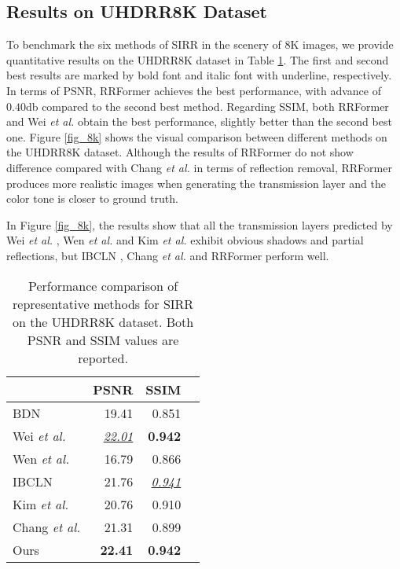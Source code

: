 \documentclass[10pt,journal]{IEEEtran}
\begin{document}
\subsection{Results on UHDRR8K Dataset}
To benchmark the six methods of SIRR in the scenery of 8K images, we provide quantitative results on the UHDRR8K dataset in Table \ref{table_8k}. The first and second best results are marked by bold font and italic font with underline, respectively. In terms of PSNR, RRFormer achieves the best performance, with advance of $0.40$db compared to the second best method. Regarding SSIM, both RRFormer and Wei \textit{et al.} \cite{weiSingleImageReflection2019} obtain the best performance, slightly better than the second best one. 
Figure \ref{fig_8k} shows the visual comparison between different methods on the UHDRR8K dataset. Although the results of RRFormer do not show difference compared with Chang \textit{et al.} \cite{changSingleImageReflection2021} in terms of reflection removal, RRFormer produces more realistic images when generating the transmission layer and the color tone is closer to ground truth. 

In Figure \ref{fig_8k}, the results show that all the transmission layers predicted by Wei \textit{et al.} \cite{weiSingleImageReflection2019}, Wen \textit{et al.} \cite{wenSingleImageReflection2019} and Kim \textit{et al.} \cite{kimSingleImageReflection2020} exhibit obvious shadows and partial reflections, but IBCLN \cite{liSingleImageReflection2020}, Chang \textit{et al.} \cite{changSingleImageReflection2021} and RRFormer perform well. 


\begin{table}[t]
	\centering
	\caption{Performance comparison of representative methods for SIRR on the UHDRR8K dataset. Both PSNR and SSIM values are reported. }
	\label{table_8k}
	\begin{tabular}{l|rrr}
		\toprule
		&PSNR&SSIM\\
		\midrule	
		BDN \cite{yangSeeingDeeplyBidirectionally2018}&19.41&0.851\\
		Wei \textit{et al.} \cite{weiSingleImageReflection2019}&\underline{\textit{22.01}}&\textbf{0.942}\\
		Wen \textit{et al.} \cite{wenSingleImageReflection2019}&16.79&0.866\\
		IBCLN \cite{liSingleImageReflection2020}&21.76&\underline{\textit{0.941}}\\
		Kim \textit{et al.} \cite{kimSingleImageReflection2020}&20.76&0.910\\
		Chang \textit{et al.} \cite{changSingleImageReflection2021}&21.31&0.899\\
		\midrule
		Ours&\textbf{22.41}&\textbf{0.942}\\
		\bottomrule
	\end{tabular}
\end{table}
\end{document}
